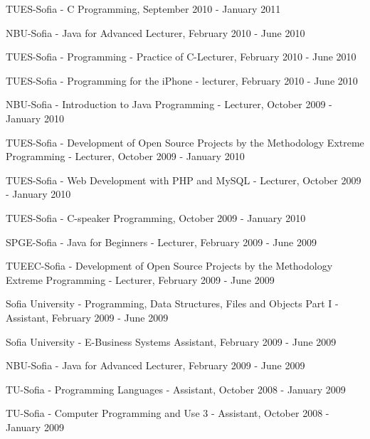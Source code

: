 \documentclass[english,a4paper]{europasscv}
\begin{document}
\begin{europasscv}
{\begin{ecvitemize}
    \item TUES-Sofia - C Programming, September 2010 - January 2011
    \item NBU-Sofia - Java for Advanced Lecturer, February 2010 - June 2010
    \item TUES-Sofia - Programming - Practice of C-Lecturer, February 2010 - June 2010
    \item TUES-Sofia - Programming for the iPhone - lecturer, February 2010 - June 2010
    \item NBU-Sofia - Introduction to Java Programming - Lecturer, October 2009 - January 2010
    \item TUES-Sofia - Development of Open Source Projects by the Methodology Extreme Programming - Lecturer, October 2009 - January 2010
    \item TUES-Sofia - Web Development with PHP and MySQL - Lecturer, October 2009 - January 2010
    \item TUES-Sofia - C-speaker Programming, October 2009 - January 2010
    \item SPGE-Sofia - Java for Beginners - Lecturer, February 2009 - June 2009
    \item TUEEC-Sofia - Development of Open Source Projects by the Methodology Extreme Programming - Lecturer, February 2009 - June 2009
    \item Sofia University - Programming, Data Structures, Files and Objects Part I - Assistant, February 2009 - June 2009
    \item Sofia University - E-Business Systems Assistant, February 2009 - June 2009
    \item NBU-Sofia - Java for Advanced Lecturer, February 2009 - June 2009
    \item TU-Sofia - Programming Languages - Assistant, October 2008 - January 2009
    \item TU-Sofia - Computer Programming and Use 3 - Assistant, October 2008 - January 2009 
  \end{ecvitemize}}
  

\end{europasscv}
\end{document}
